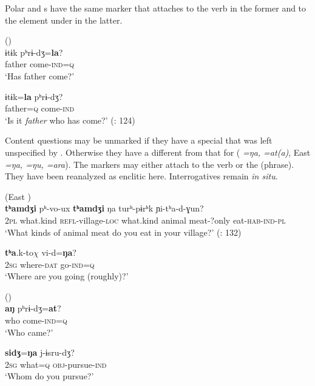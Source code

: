 Polar and s have the same marker that attaches to the verb in the former and to the element under  in the latter.

\ea%
    \label{ex:amur:6}
    \ea
     ()\\
    \gll ɨtɨk pʰrɨ-dʒ=\textbf{{la}}?\\
    father    come-\textsc{ind=q}\\
    \glt ‘Has father come?’

    \ex
    \gll ɨtɨk=\textbf{{la}} pʰrɨ-dʒ?\\
    father=\textsc{q}  come-\textsc{ind}\\
    \glt ‘Is it \textit{father} who has come?’ (\citealt{NedjalkovOtaina2013}: 124)
    \z
    \z

Content questions may be unmarked if they have a special  that was left unspecified by \citet[46]{Gruzdeva1998}. Otherwise they have a  different from that for  ( \textit{=ŋa, =at(a)}, East  \textit{=ŋa, =ŋu, =ara}). The markers may either attach to the verb or the  (phrase). They have been reanalyzed as enclitic here. Interrogatives remain \textit{in situ}.

\ea%
    \label{ex:amur:7}
     (East )\\
    \ea
     \textbf{{tʰamdʒi}} {pʰ-vo-ux} \textbf{tʰamdʒi} ŋa turʰ-pɨrʰk  ɲi-tʰa-d-ɣun?\\
    2\textsc{pl}  what.kind  \textsc{refl}-village-\textsc{loc} what.kind  animal meat-?only  eat-\textsc{hab}-\textsc{ind}-\textsc{pl}\\
    \glt ‘What kinds of animal meat do you eat in your village?’ (\citealt{ChaeHeekyung2013}: 132)

    \ex
     \textbf{{tʰa}}.k-to$\chi $  vi-d=\textbf{{ŋa}}?\\
    2\textsc{sg}  where-\textsc{dat}  go-\textsc{ind}=\textsc{q}\\
    \glt ‘Where are you going (roughly)?’ \citep[182]{Gruzdeva2008}
    \z
    \z

\ea%
    \label{ex:amur:8}
     ()\\
    \ea
    \gll \textbf{{aŋ}} {pʰrɨ-dʒ=}\textbf{{at}}?\\
    who  come-\textsc{ind=q}\\
    \glt ‘Who came?’

    \ex
     \textbf{{sidʒ}}{=}\textbf{{ŋa}} j-ɨsru-dʒ?\\
    2\textsc{sg}  what=\textsc{q}  \textsc{obj}-pursue-\textsc{ind}\\
    \glt ‘Whom do you pursue?’ \citep[46]{Gruzdeva1998}
    \z
    \z

